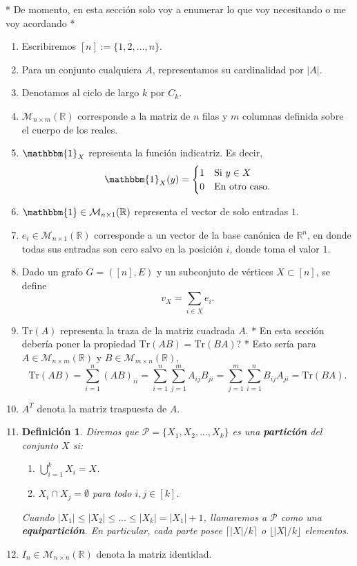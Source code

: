 \documentclass{article}[14pts]
\newcommand{\hh}[1]{{\color{red} * #1 *}}
\newtheorem{definicion}{Definición}
\newcommand{\Tr}{\mathrm{Tr}}
\begin{document}
\hh{De momento, en esta sección solo voy a enumerar lo que voy necesitando o me voy acordando}

\begin{enumerate}
    \item Escribiremos $[n] := \lbrace 1,2,...,n\rbrace$.
    \item Para un conjunto cualquiera $A$, representamos su cardinalidad por $|A|$.
    \item Denotamos al ciclo de largo $k$ por $C_{k}$.
    \item $\mathcal{M}_{n\times m}(\mathbb{R})$ corresponde a la matriz de $n$ filas y $m$ columnas definida sobre el cuerpo de los reales.
    \item $\mathbbm{1}_{X}$ representa la función indicatriz. Es decir,
    \[
        \mathbbm{1}_{X}(y) = 
        \begin{cases}
            1 & \text{Si } y\in X\\
            0 & \text{En otro caso.}
        \end{cases}
    \]
    \item $\mathbbm{1}\in\mathcal{M}_{n\times 1}(\mathbb{R})$ representa el vector de solo entradas $1$.
    \item $e_{i}\in\mathcal{M}_{n\times 1}(\mathbb{R})$ corresponde a un vector de la base canónica de $\mathbb{R}^{n}$, en donde todas sus entradas son cero salvo en la posición $i$, donde toma el valor $1$.
    \item Dado un grafo $G = ([n], E)$ y un subconjuto de vértices $X\subset [n]$, se define
    \[
        v_X = \sum_{i\in X}e_{i}.
    \]
    \item $\Tr(A)$ representa la traza de la matriz cuadrada $A$. \hh{En esta sección debería poner la propiedad $\Tr(AB) = \Tr(BA)$?}
    Esto sería para $A\in \mathcal{M}_{n\times m}(\mathbb{R})$ y  $B\in\mathcal{M}_{m\times n}(\mathbb{R})$,
    \[
        \Tr(AB) = \sum_{i=1}^{n} (AB)_{ii} = \sum_{i=1}^{n}\sum_{j=1}^{m} A_{ij}B_{ji} = \sum_{j=1}^{m}\sum_{i=1}^{n}B_{ij}A_{ji} = \Tr(BA).
    \]
    \item $A^{T}$ denota la matriz traspuesta de $A$.
    \item
    \begin{definicion}
        Diremos que $\mathcal{P} = \lbrace X_1,X_2,...,X_k\rbrace$ es una \textbf{partición} del conjunto $X$ si:
        \begin{enumerate}
            \item $\bigcup_{i=1}^{k} X_i = X$.
            \item $X_i \cap X_j = \emptyset$ para todo $i,j\in[k]$.
        \end{enumerate}
        Cuando $|X_1|\leq|X_2|\leq ...\leq |X_k| = |X_1| + 1$, llamaremos a $\mathcal{P}$ como una \textbf{equipartición}. En particular, cada parte posee $\lceil |X|/k \rceil$ o $\lfloor |X|/k\rfloor$ elementos.
    \end{definicion}
    \item $I_n \in \mathcal{M}_{n\times n}(\mathbb{R})$ denota la matriz identidad.
\end{enumerate}
\end{document}
